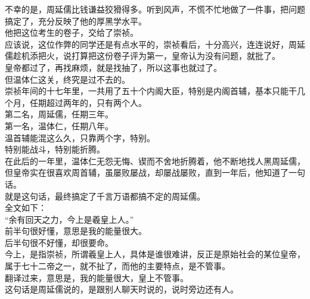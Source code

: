 \begin{multicols}{\theparacolNo}
不幸的是，周延儒比钱谦益狡猾得多。听到风声，不慌不忙地做了一件事，把问题搞定了，充分反映了他的厚黑学水平。\\

他把这位考生的卷子，交给了崇祯。\\

应该说，这位作弊的同学还是有点水平的，崇祯看后，十分高兴，连连说好，周延儒趁机添把火，说打算把这份卷子评为第一，皇帝认为没有问题，就批了。\\

皇帝都过了，再找麻烦，就是找抽了，所以这事也就过了。\\

但温体仁这关，终究是过不去的。\\

崇祯年间的十七年里，一共用了五十个内阁大臣，特别是内阁首辅，基本只能干几个月，任期超过两年的，只有两个人。\\

第二名，周延儒，任期三年。\\

第一名，温体仁，任期八年。\\

温首辅能混这么久，只靠两个字，特别。\\

特别能战斗，特别能折腾。\\

在此后的一年里，温体仁无怨无悔、锲而不舍地折腾着，他不断地找人黑周延儒，但皇帝实在很喜欢周首辅，虽屡败屡战，却屡战屡败，直到一年后，他知道了一句话。\\

就是这句话，最终搞定了千言万语都搞不定的周延儒。\\

全文如下：\\

“余有回天之力，今上是羲皇上人。”\\

前半句很好懂，意思是我的能量很大。\\

后半句很不好懂，却很要命。\\

今上，是指崇祯，所谓羲皇上人，具体是谁很难讲，反正是原始社会的某位皇帝，属于七十二帝之一，就不扯了，而他的主要特点，是不管事。\\

翻译过来，意思是，我的能量很大，皇上不管事。\\

这句话是周延儒说的，是跟别人聊天时说的，说时旁边还有人。\\


\end{multicols}
